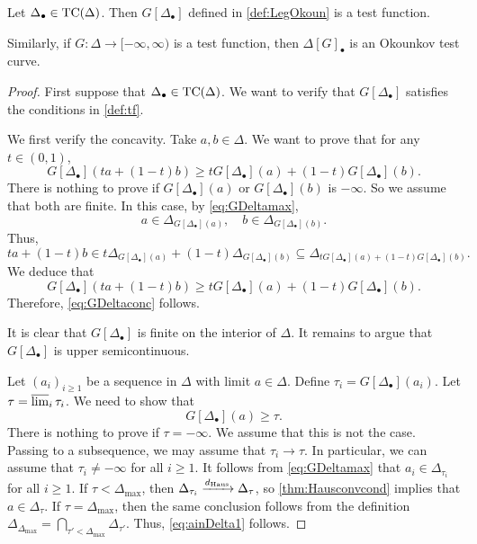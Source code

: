 \begin{lemma}\label{lma:convbodyLegendre}
    Let $\Delta_{\bullet}\in \mathrm{TC}(\Delta)$. Then $G[\Delta_{\bullet}]$ defined in \cref{def:LegOkoun} is a test function.

    Similarly, if $G\colon \Delta\rightarrow [-\infty,\infty)$ is a test function, then $\Delta[G]_{\bullet}$ is an Okounkov test curve.
\end{lemma}
\begin{proof}
    First suppose that $\Delta_{\bullet}\in \mathrm{TC}(\Delta)$. We want to verify that $G[\Delta_{\bullet}]$ satisfies the conditions in \cref{def:tf}.

    We first verify the concavity.
    Take $a,b\in \Delta$. We want to prove that for any $t\in (0,1)$,
	\begin{equation}\label{eq:GDeltaconc}
		G[\Delta_{\bullet}](ta+(1-t)b)\geq tG[\Delta_{\bullet}](a)+(1-t)G[\Delta_{\bullet}](b).
	\end{equation}
	There is nothing to prove if $G[\Delta_{\bullet}](a)$ or $G[\Delta_{\bullet}](b)$ is $-\infty$. So we assume that both are finite. In this case, by \eqref{eq:GDeltamax},
    \[
    a\in \Delta_{G[\Delta_{\bullet}](a)},\quad b\in \Delta_{G[\Delta_{\bullet}](b)}.
    \]
    Thus,
	\[
		ta+(1-t)b\in t  \Delta_{G[\Delta_{\bullet}](a)}+(1-t)\Delta_{G[\Delta_{\bullet}](b)}\subseteq \Delta_{tG[\Delta_{\bullet}](a)+(1-t)G[\Delta_{\bullet}](b)}.
	\]
	We deduce that
	\[
		G[\Delta_{\bullet}](ta+(1-t)b)\geq tG[\Delta_{\bullet}](a)+(1-t)G[\Delta_{\bullet}](b).
	\]
	Therefore, \eqref{eq:GDeltaconc} follows.

 It is clear that $G[\Delta_{\bullet}]$ is finite on the interior of $\Delta$. It remains to argue that $G[\Delta_{\bullet}]$ is upper semicontinuous.

 Let $(a_i)_{i\geq 1}$ be a sequence in $\Delta$ with limit $a\in \Delta$. Define $\tau_i=G[\Delta_{\bullet}](a_i)$. Let $\tau=\varlimsup_i \tau_i$.
	We need to show that
	\begin{equation}\label{eq:ainDelta1}
		G[\Delta_{\bullet}](a)\geq \tau.
	\end{equation}
    There is nothing to prove if $\tau=-\infty$. We assume that this is not the case. Passing to a subsequence, we may assume that $\tau_i\to \tau$. In particular, we can assume that $\tau_i\neq -\infty$ for all $i\geq 1$.
    It follows from \eqref{eq:GDeltamax} that $a_i\in\Delta_{\tau_i}$ for all $i\geq 1$.
    If $\tau<\Delta_{\max}$, then $\Delta_{\tau_i}\xrightarrow{d_{\mathrm{Haus}}}\Delta_{\tau}$, so \cref{thm:Hausconvcond} implies that $a\in \Delta_{\tau}$. If $\tau=\Delta_{\max}$, then the same conclusion follows from the definition $\Delta_{\Delta_{\max}}=\bigcap_{\tau'<\Delta_{\max}}\Delta_{\tau'}$.
    Thus, \eqref{eq:ainDelta1} follows.


\end{proof}
